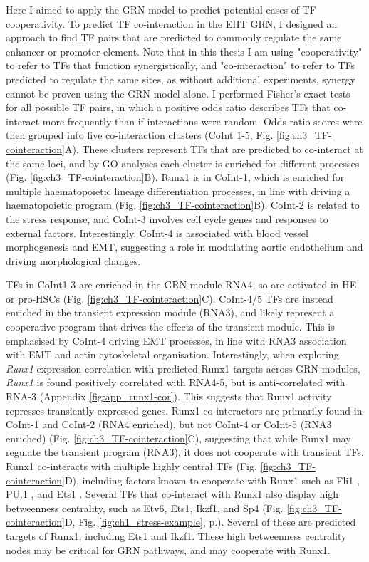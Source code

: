Here I aimed to apply the GRN model to predict potential cases of TF cooperativity. To predict TF co-interaction in the EHT GRN, I designed an approach to find TF pairs that are predicted to commonly regulate the same enhancer or promoter element. Note that in this thesis I am using "cooperativity" to refer to TFs that function synergistically, and "co-interaction" to refer to TFs predicted to regulate the same sites, as without additional experiments, synergy cannot be proven using the GRN model alone. I performed Fisher's exact tests for all possible TF pairs, in which a positive odds ratio describes TFs that co-interact more frequently than if interactions were random. Odds ratio scores were then grouped into five co-interaction clusters (CoInt 1-5, Fig. \ref{fig:ch3_TF-cointeraction}A). These clusters represent TFs that are predicted to co-interact at the same loci, and by GO analyses each cluster is enriched for different processes (Fig. \ref{fig:ch3_TF-cointeraction}B). Runx1 is in CoInt-1, which is enriched for multiple haematopoietic lineage differentiation processes, in line with driving a haematopoietic program (Fig. \ref{fig:ch3_TF-cointeraction}B). CoInt-2 is related to the stress response, and CoInt-3 involves cell cycle genes and responses to external factors. Interestingly, CoInt-4 is associated with blood vessel morphogenesis and EMT, suggesting a role in modulating aortic endothelium and driving morphological changes.

TFs in CoInt1-3 are enriched in the GRN module RNA4, so are activated in HE or pro-HSCs (Fig. \ref{fig:ch3_TF-cointeraction}C). CoInt-4/5 TFs are instead enriched in the transient expression module (RNA3), and likely represent a cooperative program that drives the effects of the transient module. This is emphasised by CoInt-4 driving EMT processes, in line with RNA3 association with EMT and actin cytoskeletal organisation. Interestingly, when exploring \textit{Runx1} expression correlation with predicted Runx1 targets across GRN modules, \textit{Runx1} is found positively correlated with RNA4-5, but is anti-correlated with RNA-3 (Appendix \ref{fig:app_runx1-cor}). This suggests that Runx1 activity represses transiently expressed genes. Runx1 co-interactors are primarily found in CoInt-1 and CoInt-2 (RNA4 enriched), but not CoInt-4 or CoInt-5 (RNA3 enriched) (Fig. \ref{fig:ch3_TF-cointeraction}C), suggesting that while Runx1 may regulate the transient program (RNA3), it does not cooperate with transient TFs. Runx1 co-interacts with multiple highly central TFs (Fig. \ref{fig:ch3_TF-cointeraction}D), including factors known to cooperate with Runx1 such as Fli1 \citep{lichtinger_runx1_2012}, PU.1 \citep{hu_runx1_2011}, and Ets1 \citep{kim_mutual_1999, goetz_auto-inhibition_2000}. Several TFs that co-interact with Runx1 also display high betweenness centrality, such as Etv6, Ets1, Ikzf1, and Sp4 (Fig. \ref{fig:ch3_TF-cointeraction}D, Fig. \ref{fig:ch1_stress-example}, p.\pageref{fig:ch1_stress-example}). Several of these are predicted targets of Runx1, including Ets1 and Ikzf1. These high betweenness centrality nodes may be critical for GRN pathways, and may cooperate with Runx1. 


